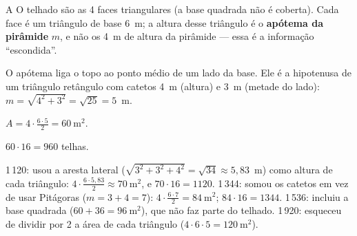 \begin{resolucao}{A}
 O telhado são as 4 faces triangulares (a base quadrada não
é coberta). Cada face é um triângulo de base 6~m; a altura desse triângulo é o
\textbf{apótema da pirâmide} $m$, e não os 4~m de altura da pirâmide — essa é a
informação “escondida”.

 O apótema liga o topo ao ponto médio de um lado da
base. Ele é a hipotenusa de um triângulo retângulo com catetos 4~m (altura) e
3~m (metade do lado): $m = \sqrt{4^2 + 3^2} = \sqrt{25} = 5$~m.

 $A = 4\cdot\frac{6\cdot 5}{2} = 60\ \text{m}^2$.

 $60\cdot 16 = 960$ telhas.

\begin{distratores}
 1\,120: usou a aresta lateral ($\sqrt{3^2+3^2+4^2} = \sqrt{34}\approx 5{,}83$~m)
como altura de cada triângulo: $4\cdot\frac{6\cdot 5{,}83}{2}\approx 70\ \text{m}^2$,
e $70\cdot 16 = 1120$.
 1\,344: somou os catetos em vez de usar Pitágoras ($m = 3 + 4 = 7$):
$4\cdot\frac{6\cdot 7}{2} = 84\ \text{m}^2$; $84\cdot 16 = 1344$.
 1\,536: incluiu a base quadrada ($60 + 36 = 96\ \text{m}^2$), que não faz
parte do telhado.
 1\,920: esqueceu de dividir por 2 a área de cada triângulo
($4\cdot 6\cdot 5 = 120\ \text{m}^2$).
\end{distratores}
\end{resolucao}

